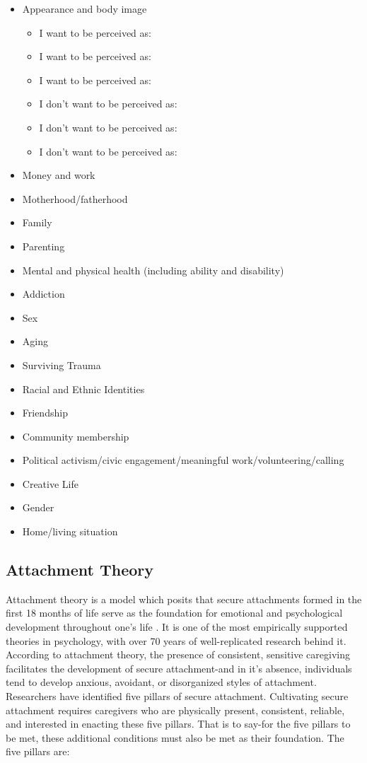 \documentclass[12pt,letterpaper]{book}
\begin{document}
\begin{itemize}
    \item Appearance and body image
    \begin{itemize}
        \item I want to be perceived as:
        \item I want to be perceived as:
        \item I want to be perceived as:
        \item I don't want to be perceived as:
        \item I don't want to be perceived as:
        \item I don't want to be perceived as:
    \end{itemize}
    \item Money and work
    \item Motherhood/fatherhood
    \item Family
    \item Parenting
    \item Mental and physical health (including ability and disability)
    \item Addiction
    \item Sex
    \item Aging
    \item Surviving Trauma
    \item Racial and Ethnic Identities
    \item Friendship
    \item Community membership
    \item Political activism/civic engagement/meaningful work/volunteering/calling
    \item Creative Life
    \item Gender
    \item Home/living situation
\end{itemize}
\subsection{Attachment Theory}
\label{attachment}
Attachment theory is a model which posits that secure attachments formed in the first 18 months of life serve as the foundation for emotional and psychological development throughout one's life \cite{brownAttachmentDisturbances}. It is one of the most empirically supported theories in psychology, with over 70 years of well-replicated research behind it. According to attachment theory, the presence of consistent, sensitive caregiving facilitates the development of secure attachment-and in it's absence, individuals tend to develop anxious, avoidant, or disorganized styles of attachment. Researchers have identified five pillars of secure attachment. Cultivating secure attachment requires caregivers who are physically present, consistent, reliable, and interested in enacting these five pillars. That is to say-for the five pillars to be met, these additional conditions must also be met as their foundation. The five pillars are:
\end{document}
